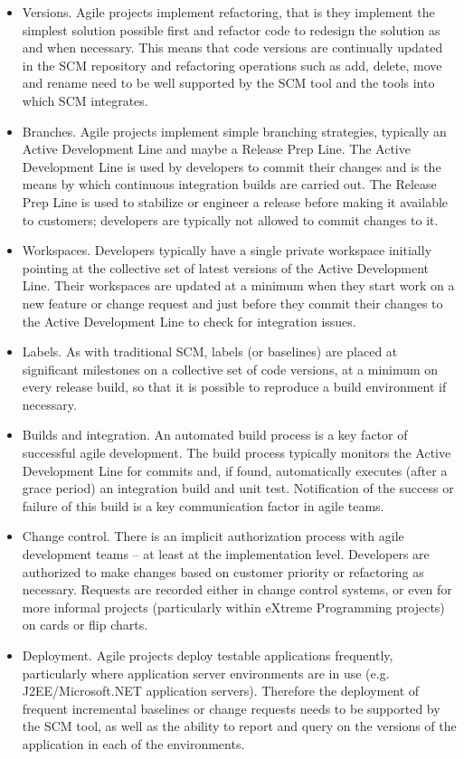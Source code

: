 \documentclass{article}
\begin{document}
\begin{itemize}
\item Versions. Agile projects implement refactoring, that is they implement the simplest solution possible first and refactor code to redesign the solution as and when necessary. This means that code versions are continually updated in the SCM repository and refactoring operations such as add, delete, move and rename need to be well supported by the SCM tool and the tools into which SCM integrates.
\item Branches. Agile projects implement simple branching strategies, typically an Active Development Line and maybe a Release Prep Line. The Active Development Line is used by developers to commit their changes and is the means by which continuous integration builds are carried out. The Release Prep Line is used to stabilize or engineer a release before making it available to customers; developers are typically not allowed to commit changes to it.
\item Workspaces. Developers typically have a single private workspace initially pointing at the collective set of latest versions of the Active Development Line. Their workspaces are updated at a minimum when they start work on a new feature or change request and just before they commit their changes to the Active Development Line to check for integration issues.
\item Labels. As with traditional SCM, labels (or baselines) are placed at significant milestones on a collective set of code versions, at a minimum on every release build, so that it is possible to reproduce a build environment if necessary.
\item Builds and integration. An automated build process is a key factor of successful agile development. The build process typically monitors the Active Development Line for commits and, if found, automatically executes (after a grace period) an integration build and unit test. Notification of the success or failure of this build is a key communication factor in agile teams.
\item Change control. There is an implicit authorization process with agile development teams – at least at the implementation level. Developers are authorized to make changes based on customer priority or refactoring as necessary. Requests are recorded either in change control systems, or even for more informal projects (particularly within eXtreme Programming projects) on cards or flip charts.
\item Deployment. Agile projects deploy testable applications frequently, particularly where application server environments are in use (e.g. J2EE/Microsoft.NET application servers). Therefore the deployment of frequent incremental baselines or change requests needs to be supported by the SCM tool, as well as the ability to report and query on the versions of the application in each of the environments.
\end{itemize}


\end{document}
